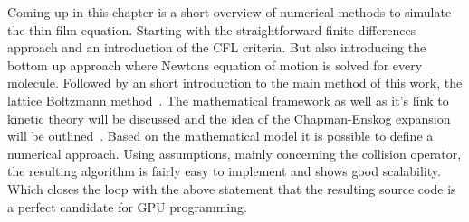 Coming up in this chapter is a short overview of numerical methods to simulate the thin film equation.
Starting with the straightforward finite differences approach and an introduction of the CFL criteria.
But also introducing the bottom up approach where Newtons equation of motion is solved for every molecule.
Followed by an short introduction to the main method of this work, the lattice Boltzmann method~\cite{PhysRevLett.56.1505, krugerLatticeBoltzmannMethod2017, succi}. 
The mathematical framework as well as it's link to kinetic theory will be discussed and the idea of the Chapman-Enskog expansion will be outlined~\cite{chapmanMathematicalTheoryNonuniform1990, enskogKinetischeTheorieVorgange1917}. 
Based on the mathematical model it is possible to define a numerical approach.
Using assumptions, mainly concerning the collision operator, the resulting algorithm is fairly easy to implement and shows good scalability.
Which closes the loop with the above statement that the resulting source code is a perfect candidate for GPU programming.

